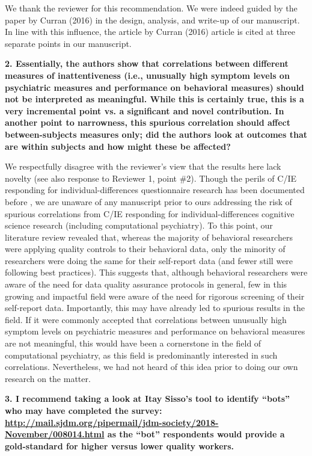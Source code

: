 \documentclass[a4paper,notitlepage,12pt]{article}
\begin{document}
We thank the reviewer for this recommendation. We were indeed guided by the paper by Curran (2016) in the design, analysis, and write-up of our manuscript. In line with this influence, the article by Curran (2016) article is cited at three separate points in our manuscript.

\textbf{2. Essentially, the authors show that correlations between different measures of inattentiveness (i.e., unusually high symptom levels on psychiatric measures and performance on behavioral measures) should not be interpreted as meaningful. While this is certainly true, this is a very incremental point vs. a significant and novel contribution. In another point to narrowness, this spurious correlation should affect between-subjects measures only; did the authors look at outcomes that are within subjects and how might these be affected?}

We respectfully disagree with the reviewer's view that the results here lack novelty (see also response to Reviewer 1, point \#2). Though the perils of C/IE responding for individual-differences questionnaire research has been documented before \cite{chandler2020participant, arias2020little}, we are unaware of any manuscript prior to ours addressing the risk of spurious correlations from C/IE responding for individual-differences cognitive science research (including computational psychiatry). To this point, our literature review revealed that, whereas the majority of behavioral researchers were applying quality controls to their behavioral data, only the minority of researchers were doing the same for their self-report data (and fewer still were following best practices). This suggests that, although behavioral researchers were aware of the need for data quality assurance protocols in general, few in this growing and impactful field were aware of the need for rigorous screening of their self-report data. Importantly, this may have already led to spurious results in the field. If it were commonly accepted that correlations between unusually high symptom levels on psychiatric measures and performance on behavioral measures are not meaningful, this would have been a cornerstone in the field of computational psychiatry, as this field is predominantly interested in such correlations. Nevertheless, we had not heard of this idea prior to doing our own research on the matter.

\textbf{3. I recommend taking a look at Itay Sisso's tool to identify ``bots'' who may have completed the survey: \url{http://mail.sjdm.org/pipermail/jdm-society/2018-November/008014.html} as the ``bot'' respondents would provide a gold-standard for higher versus lower quality workers.}
\end{document}
